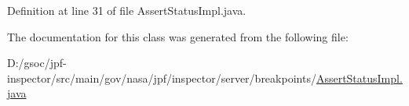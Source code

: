 Definition at line 31 of file Assert\+Status\+Impl.\+java.



The documentation for this class was generated from the following file\+:\begin{DoxyCompactItemize}
\item 
D\+:/gsoc/jpf-\/inspector/src/main/gov/nasa/jpf/inspector/server/breakpoints/\hyperlink{_assert_status_impl_8java}{Assert\+Status\+Impl.\+java}\end{DoxyCompactItemize}
